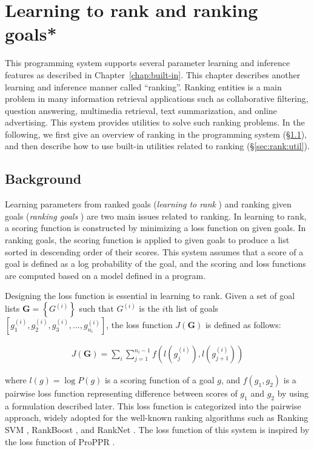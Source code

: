 \documentclass[a4paper]{report}
\makeatletter
\let\tts@ve\tt
\def\tt{\tts@ve\ifmmode\def\_{\mathchar`\_}\else\def\_{\char`\_}\fi}
\def\index#1{%
  \@bsphack\begingroup
  \let\tt\tts@ve
  \def\protect##1{\string##1\space}\@sanitize
  \@wrindex{#1}}
\newcommand{\bvec}[1]{\boldsymbol{#1}}
\newcommand{\conindex}[1]{\index{concept}{#1}}
\newcommand{\secref}[1]{\S\ref{#1}}
\newcommand{\vG}{\bvec{G}}
\makeatother
\begin{document}
\chapter{Learning to rank and ranking goals*}
\label{chap:rank}

This programming system supports several parameter learning and inference features as described in Chapter~\ref{chap:built-in}.
This chapter describes another learning and inference manner called ``ranking''.
Ranking entities is a main problem in many information retrieval applications such as collaborative filtering, question answering, multimedia retrieval, text summarization, and online advertising.
This system provides utilities to solve such ranking problems.
In the following, we first give an overview of ranking in the programming system (\secref{sec:rank:background}), and then describe how to use built-in utilities related to ranking (\secref{sec:rank:util}).

\section{Background}
\label{sec:rank:background}

Learning parameters from ranked goals ({\it learning to rank}\conindex{learning to rank}) and ranking given goals ({\it ranking goals}\conindex{ranking goals}) are two main issues related to ranking.
In learning to rank, a scoring function is constructed by minimizing a loss function on given goals.
In ranking goals, the scoring function is applied to given goals to
produce a list sorted in descending order of their scores.
This system assumes that a score of a goal is defined as a log probability of the goal,
and the scoring and loss functions are computed based on a model defined in a program.

Designing the loss function is essential in learning to rank.
Given a set of goal lists $\vG=\left\{ G^{(i)}\right\}$ such that $G^{(i)}$ is the $i$th list of goals $\left[g^{(i)}_1, g^{(i)}_2, g^{(i)}_3, ..., g^{(i)}_{n_i} \right]$, the loss function $J(\vG)$ is defined as follows:

\begin{eqnarray}
J(\vG) = \sum_{i} \sum_{j=1}^{n_i-1} f( l(g^{(i)}_{j}), l(g^{(i)}_{j+1}) )
\label{eq:rank_loss}
\end{eqnarray}

where
$l(g) = \log P(g)$ is a scoring function of a goal $g$, and $f(g_1, g_2)$ is a pairwise loss function representing difference between scores of $g_1$ and $g_2$ by using a formulation described later.
This loss function is categorized into the pairwise approach, widely adopted
for the well-known ranking algorithms such as Ranking SVM \cite{joachims2002optimizing}, RankBoost \cite{freund2003efficient}, and RankNet \cite{burges2005learning}.
The loss function of this system is inspired by the loss function of ProPPR \cite{wang2013programming}.
\end{document}
